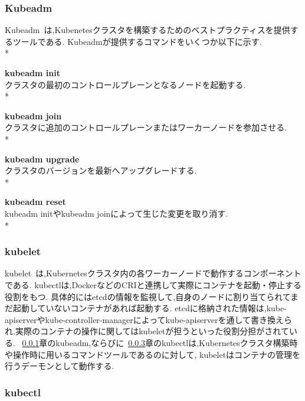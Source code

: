 \subsubsection{Kubeadm}
\label{background:container-orchestration-system:kubernetes:kubeadm}

Kubeadm~\cite{Kubeadm}は,Kubenetesクラスタを構築するためのベストプラクティスを提供するツールである.
Kubeadmが提供するコマンドをいくつか以下に示す.\\*

{\bf kubeadm init}\\
クラスタの最初のコントロールプレーンとなるノードを起動する.\\*

{\bf kubeadm join}\\
クラスタに追加のコントロールプレーンまたはワーカーノードを参加させる.\\*

{\bf kubeadm upgrade}\\
クラスタのバージョンを最新へアップグレードする.\\*

{\bf kubeadm reset}\\
kubeadm initやkubeadm joinによって生じた変更を取り消す.\\*

\subsubsection{kubelet}
\label{background:container-orchestration-system:kubernetes:kubelet}

kubelet~\cite{kubelet}は,Kubernetesクラスタ内の各ワーカーノードで動作するコンポーネントである.
kubectlは,DockerなどのCRIと連携して実際にコンテナを起動・停止する役割をもつ.
具体的にはetcdの情報を監視して,自身のノードに割り当てられてまだ起動していないコンテナがあれば起動する.
etcdに格納された情報は,kube-apiserverやkube-controller-managerによってkube-apiserverを通して書き換えられ,実際のコンテナの操作に関してはkubeletが担うといった役割分担がされている.
~\ref{background:container-orchestration-system:kubernetes:kubeadm}章のkubeadm,ならびに~\ref{background:container-orchestration-system:kubernetes:kubectl}章のkubectlは,Kubernetesクラスタ構築時や操作時に用いるコマンドツールであるのに対して,
kubeletはコンテナの管理を行うデーモンとして動作する.

\subsubsection{kubectl}
\label{background:container-orchestration-system:kubernetes:kubectl}


